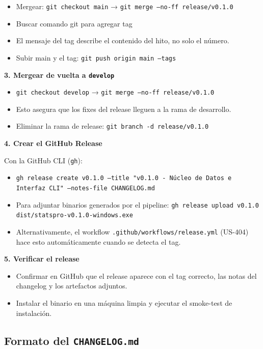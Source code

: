 \documentclass[11pt,a4paper]{article}
\newcommand{\fpath}[1]{\texttt{\small #1}}
\begin{document}
\begin{itemize}[nosep]
  \item Mergear: \fpath{git checkout main} → \fpath{git merge --no-ff release/v0.1.0}
	\item  Buscar comando git para agregar tag
  \item El mensaje del tag describe el contenido del hito, no solo el número.
  \item Subir main y el tag: \fpath{git push origin main --tags}
\end{itemize}

\textbf{3. Mergear de vuelta a \fpath{develop}}

\begin{itemize}[nosep]
  \item \fpath{git checkout develop} → \fpath{git merge --no-ff release/v0.1.0}
  \item Esto asegura que los fixes del release lleguen a la rama de desarrollo.
  \item Eliminar la rama de release: \fpath{git branch -d release/v0.1.0}
\end{itemize}

\textbf{4. Crear el GitHub Release}

Con la GitHub CLI (\fpath{gh}):
\begin{itemize}[nosep]
  \item \fpath{gh release create v0.1.0 --title "v0.1.0 - Núcleo de Datos e Interfaz CLI" --notes-file CHANGELOG.md}
  \item Para adjuntar binarios generados por el pipeline: \fpath{gh release upload v0.1.0 dist/statspro-v0.1.0-windows.exe}
  \item Alternativamente, el workflow \fpath{.github/workflows/release.yml} (US-404) hace esto automáticamente cuando se detecta el tag.
\end{itemize}

\textbf{5. Verificar el release}

\begin{itemize}[nosep]
  \item Confirmar en GitHub que el release aparece con el tag correcto, las notas del changelog y los artefactos adjuntos.
  \item Instalar el binario en una máquina limpia y ejecutar el smoke-test de instalación.
\end{itemize}

\subsection{Formato del \texttt{CHANGELOG.md}}
\end{document}
